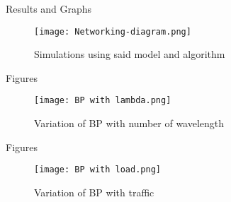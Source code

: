 \documentclass{beamer}
\begin{document}
\begin{frame}{Results and Graphs}
  \begin{figure}[!]
    \centering
     \texttt{[image: Networking-diagram.png]}
    \caption{Simulations using said model and algorithm}
  \end{figure}  
\end{frame}
\begin{frame}{Figures}
  \begin{figure}[!]
    \centering
     \texttt{[image: BP with lambda.png]}
    \caption{Variation of BP with number of wavelength}
  \end{figure}
\end{frame}
\begin{frame}{Figures}
  \begin{figure}[!]
    \centering
     \texttt{[image: BP with load.png]}
    \caption{Variation of BP with traffic}
  \end{figure}
\end{frame}
\end{document}
